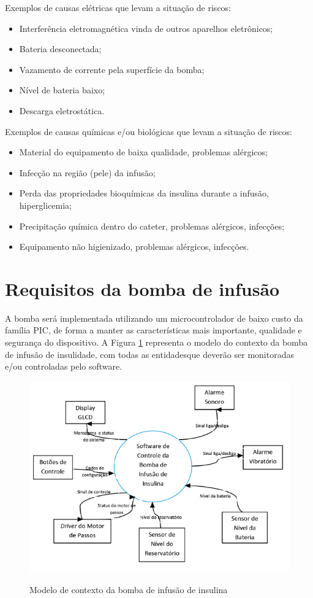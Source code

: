 Exemplos de causas elétricas que levam a situação de riscos:
\begin{itemize}
\item Interferência eletromagnética vinda de outros aparelhos eletrônicos;
\item Bateria desconectada;
\item Vazamento de corrente pela superfície da bomba;
\item Nível de bateria baixo;
\item Descarga eletrostática.
\end{itemize}

Exemplos de causas químicas e/ou biológicas que levam a situação de riscos:
\begin{itemize}
\item Material do equipamento de baixa qualidade, problemas alérgicos;
\item Infecção na região (pele) da infusão;
\item Perda das propriedades bioquímicas da insulina durante a infusão, hiperglicemia;
\item Precipitação química dentro do cateter, problemas alérgicos, infecções;
\item Equipamento não higienizado, problemas alérgicos, infecções.
\end{itemize}

\section{Requisitos da bomba de infusão}

A bomba será implementada utilizando um microcontrolador de baixo custo da família PIC, de forma a manter as características mais importante, qualidade e segurança do dispositivo. A Figura \ref{fig:contextobomba} representa o modelo do contexto da bomba de infusão de insulidade, com todas as entidadesque deverão ser monitoradas e/ou controladas pelo software.

\begin{figure}[htp]
	\centering
	\includegraphics[scale=1]{images/contexto_bomba.png}
	\caption{Modelo de contexto da bomba de infusão de insulina}	
	\label{fig:contextobomba}
	\cite{galvao2013requirements}
\end{figure}

